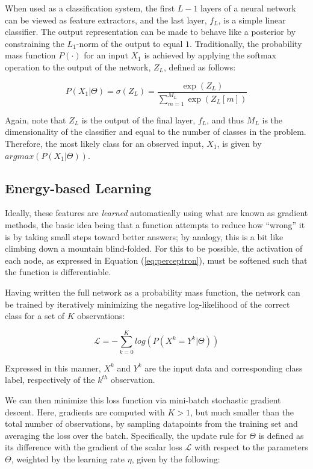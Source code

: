 When used as a classification system, the first $L-1$ layers of a neural network can be viewed as feature extractors, and the last layer, $f_L$, is a simple linear classifier.
The output representation can be made to behave like a posterior by constraining the $L_1$-norm of the output to equal $1$.
Traditionally, the probability mass function $P(\cdot)$ for an input $X_1$ is achieved by applying the softmax operation to the output of the network, $Z_L$, defined as follows:

\begin{equation}
\label{eq:softmax}
P(X_1 | \Theta) = \sigma(Z_L) = \frac{\exp(Z_{L})}{ \sum_{m=1}^{M_{L}}\exp{(Z_{L}[m])}}
\end{equation}

\noindent Again, note that $Z_{L}$ is the output of the final layer, $f_L$, and thus $M_L$ is the dimensionality of the classifier and equal to the number of classes in the problem.
Therefore, the most likely class for an observed input, $X_1$, is given by $argmax(P(X_{1} | \Theta))$.

\subsection{Energy-based Learning}

Ideally, these features are \emph{learned} automatically using what are known as gradient methods, the basic idea being that a function attempts to reduce how ``wrong'' it is by taking small steps toward better answers; by analogy, this is a bit like climbing down a mountain blind-folded.
For this to be possible, the activation of each node, as expressed in Equation (\ref{eq:perceptron}), must be softened such that the function is differentiable.


Having written the full network as a probability mass function, the network can be trained by iteratively minimizing the negative log-likelihood of the correct class for a set of $K$ observations:

\begin{equation}
\label{eq:nll}
\mathcal{L}=-\sum_{k=0}^K log(P(X^k = Y^k \vert \Theta))
\end{equation}

\noindent Expressed in this manner, $X^k$ and $Y^k$ are the input data and corresponding class label, respectively of the $k^{th}$ observation.

We can then minimize this loss function via mini-batch stochastic gradient descent.
Here, gradients are computed with $K>1$, but much smaller than the total number of observations, by sampling datapoints from the training set and averaging the loss over the batch.
Specifically, the update rule for $\Theta$ is defined as its difference with the gradient of the scalar loss $\mathcal{L}$ with respect to the parameters $\Theta$, weighted by the learning rate $\eta$, given by the following:

